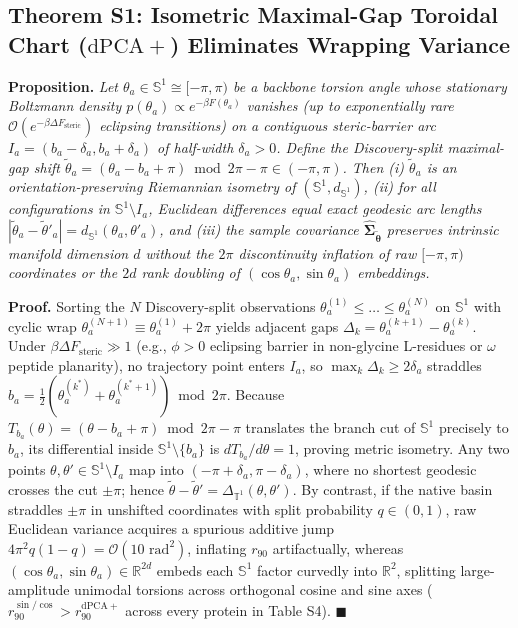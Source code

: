 \documentclass[10pt,letterpaper]{article}
\begin{document}
\subsection{Theorem S1: Isometric Maximal-Gap Toroidal Chart ($\mathrm{dPCA}+$) Eliminates Wrapping Variance}
\textbf{Proposition.} \textit{Let $\theta_a \in \mathbb{S}^1 \cong [-\pi,\pi)$ be a backbone torsion angle whose stationary Boltzmann density $p(\theta_a) \propto e^{-\beta F(\theta_a)}$ vanishes (up to exponentially rare $\mathcal{O}(e^{-\beta\Delta F_{\mathrm{steric}}})$ eclipsing transitions) on a contiguous steric-barrier arc $I_a = (b_a - \delta_a, b_a + \delta_a)$ of half-width $\delta_a > 0$. Define the Discovery-split maximal-gap shift $\tilde{\theta}_a = (\theta_a - b_a + \pi)\bmod 2\pi - \pi \in (-\pi,\pi)$. Then (i) $\tilde{\theta}_a$ is an orientation-preserving Riemannian isometry of $(\mathbb{S}^1, d_{\mathbb{S}^1})$, (ii) for all configurations in $\mathbb{S}^1 \setminus I_a$, Euclidean differences equal exact geodesic arc lengths $|\tilde{\theta}_a - \tilde{\theta}'_a| = d_{\mathbb{S}^1}(\theta_a,\theta'_a)$, and (iii) the sample covariance $\hat{\bm{\Sigma}}_{\tilde{\bm{\theta}}}$ preserves intrinsic manifold dimension $d$ without the $2\pi$ discontinuity inflation of raw $[-\pi,\pi)$ coordinates or the $2d$ rank doubling of $(\cos\theta_a,\sin\theta_a)$ embeddings.}

\textbf{Proof.} Sorting the $N$ Discovery-split observations $\theta_a^{(1)} \le \dots \le \theta_a^{(N)}$ on $\mathbb{S}^1$ with cyclic wrap $\theta_a^{(N+1)} \equiv \theta_a^{(1)} + 2\pi$ yields adjacent gaps $\Delta_k = \theta_a^{(k+1)} - \theta_a^{(k)}$. Under $\beta\Delta F_{\mathrm{steric}} \gg 1$ (e.g., $\phi > 0$ eclipsing barrier in non-glycine L-residues or $\omega$ peptide planarity), no trajectory point enters $I_a$, so $\max_k \Delta_k \ge 2\delta_a$ straddles $b_a = \frac{1}{2}(\theta_a^{(k^*)} + \theta_a^{(k^*+1)}) \bmod 2\pi$. Because $T_{b_a}(\theta) = (\theta - b_a + \pi)\bmod 2\pi - \pi$ translates the branch cut of $\mathbb{S}^1$ precisely to $b_a$, its differential inside $\mathbb{S}^1\setminus\{b_a\}$ is $dT_{b_a}/d\theta = 1$, proving metric isometry. Any two points $\theta,\theta' \in \mathbb{S}^1\setminus I_a$ map into $(-\pi+\delta_a,\pi-\delta_a)$, where no shortest geodesic crosses the cut $\pm\pi$; hence $\tilde{\theta} - \tilde{\theta}' = \Delta_{\mathbb{T}^1}(\theta,\theta')$. By contrast, if the native basin straddles $\pm\pi$ in unshifted coordinates with split probability $q \in (0,1)$, raw Euclidean variance acquires a spurious additive jump $4\pi^2 q(1-q) = \mathcal{O}(10\text{ rad}^2)$, inflating $r_{90}$ artifactually, whereas $(\cos\theta_a,\sin\theta_a)\in\mathbb{R}^{2d}$ embeds each $\mathbb{S}^1$ factor curvedly into $\mathbb{R}^2$, splitting large-amplitude unimodal torsions across orthogonal cosine and sine axes ($r_{90}^{\sin/\cos} > r_{90}^{\mathrm{dPCA}+}$ across every protein in Table S4). $\blacksquare$
\end{document}
